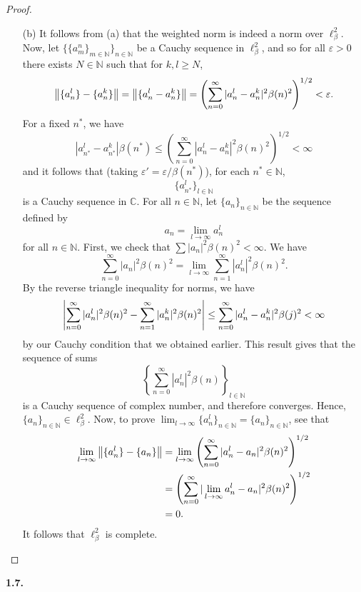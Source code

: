 \documentclass[12pt]{article}
\theoremstyle{definition}
\begin{document}
\begin{proof}
\begin{itemize}
			\item[(b)] It follows from (a) that the weighted norm is indeed a norm over $\ell_\beta^2$. Now, let $\{\{a_m^n\}_{m \in \mathbb{N}}\}_{n \in \mathbb{N}}$ be a Cauchy sequence in $\ell_\beta^2$, and so for all $\varepsilon > 0$ there exists $N \in \mathbb{N}$ such that for $k, l \geq N$, $$\norm{\{a_n^l\} - \{a_n^k\}} = \norm{\{a_n^l - a_n^k\}} = \left(\sum_{n = 0}^\infty |a_n^l - a_n^k|^2 \beta(n)^2\right)^{1/2} < \varepsilon.$$ For a fixed $n^\ast$, we have $$|a_{n^\ast}^l - a_{n^\ast}^k|\beta(n^\ast) \leq \left(\sum_{n = 0}^\infty |a_n^l - a_n^k|^2 \beta(n)^2\right)^{1/2} < \infty$$ and it follows that (taking $\varepsilon' = \varepsilon/\beta(n^\ast)$), for each $n^\ast \in \mathbb{N}$, $$\{a_{n^\ast}^l\}_{l \in \mathbb{N}}$$ is a Cauchy sequence in $\mathbb{C}$. For all $n \in \mathbb{N}$, let $\{a_n\}_{n \in \mathbb{N}}$ be the sequence defined by $$a_n = \lim_{l \to \infty} a_n^l$$ for all $n \in \mathbb{N}$. First, we check that $\sum |a_n|^2 \beta(n)^2 < \infty$. We have $$\sum_{n = 0}^\infty |a_n|^2 \beta(n)^2 = \lim_{l \to \infty} \sum_{n = 1}^\infty |a_n^l|^2 \beta(n)^2.$$ By the reverse triangle inequality for norms, we have $$\abs{\sum_{n = 0}^\infty |a_n^l|^2\beta(n)^2 - \sum_{n = 1}^\infty |a_n^k|^2\beta(n)^2} \leq \sum_{n = 0}^\infty |a_n^l - a_n^k|^2 \beta(j)^2 < \infty$$ by our Cauchy condition that we obtained earlier. This result gives that the sequence of sums $$\left\{\sum_{n  = 0}^\infty |a_n^l|^2 \beta(n)\right\}_{l \in \mathbb{N}}$$ is a Cauchy sequence of complex number, and therefore converges. Hence, $\{a_n\}_{n \in \mathbb{N}} \in \ell_\beta^2$. Now, to prove $\lim_{l \to \infty} \{a_n^l\}_{n \in \mathbb{N}} = \{a_n\}_{n \in \mathbb{N}}$, see that
				\begin{align*}
					\lim_{l \to \infty} \norm{\{a_n^l\} - \{a_n\}} &= \lim_{l \to \infty}\left(\sum_{n = 0}^\infty|a_n^l - a_n|^2 \beta(n)^2\right)^{1/2} \\
					&= \left(\sum_{n = 0}^\infty |\lim_{l \to \infty}a_n^l - a_n|^2 \beta(n)^2\right)^{1/2} \\
					&= 0. 
				\end{align*} 
			It follows that $\ell_\beta^2$ is complete. 
		\end{itemize}
	\end{proof}
	
\noindent \textbf{1.7.}
\end{document}
